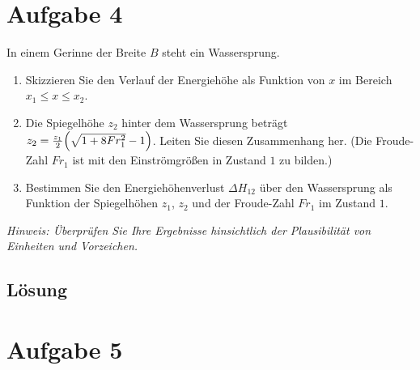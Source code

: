 \documentclass{exercise}
\begin{document}
    \section*{Aufgabe 4}

    \begin{problem}
        In einem Gerinne der Breite \(B\) steht ein Wassersprung.
        \begin{enumerate}
            \item Skizzieren Sie den Verlauf der Energiehöhe als Funktion von \(x\) im Bereich \(x_1 \le x \le x_2\).
            \item Die Spiegelhöhe \(z_2\) hinter dem Wassersprung beträgt \(z_2 = \frac{z_1}{2}\parentheses*{\sqrt{1 + 8Fr_1^2} - 1}\).
            Leiten Sie diesen Zusammenhang her.
            (Die Froude-Zahl \(Fr_1\) ist mit den Einströmgrößen in Zustand \(1\) zu bilden.)
            \item Bestimmen Sie den Energiehöhenverlust \(\Delta H_{12}\) über den Wassersprung als Funktion der Spiegelhöhen \(z_1\), \(z_2\) und der Froude-Zahl \(Fr_1\) im Zustand \(1\).
        \end{enumerate}
        \emph{Hinweis: Überprüfen Sie Ihre Ergebnisse hinsichtlich der Plausibilität von Einheiten und Vorzeichen.}
    \end{problem}

    \subsection*{Lösung}


    \section*{Aufgabe 5}
\end{document}
